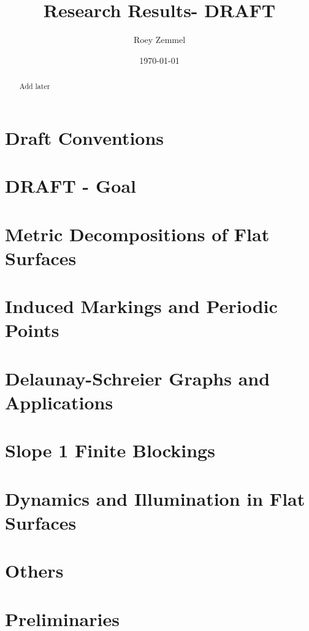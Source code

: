 \documentclass{amsart}
\title{Research Results- DRAFT}
\author{Roey Zemmel}
\date{\today}
\begin{document}
\begin{abstract}
    Add later
\end{abstract}

\maketitle
\section*{Draft Conventions}
{\color{blue}{Sketch}}
{\color{red}{Conjecture}}
{\color{brown}{Meta}}

\noindent
\section{DRAFT - Goal}

\section{Metric Decompositions of Flat Surfaces}

\section{Induced Markings and Periodic Points}

\section{Delaunay-Schreier Graphs and Applications}

\section{Slope 1 Finite Blockings}

\section{Dynamics and Illumination in Flat Surfaces}

\section{Others}

\section{Preliminaries}

\newpage
  
 
\end{document}

